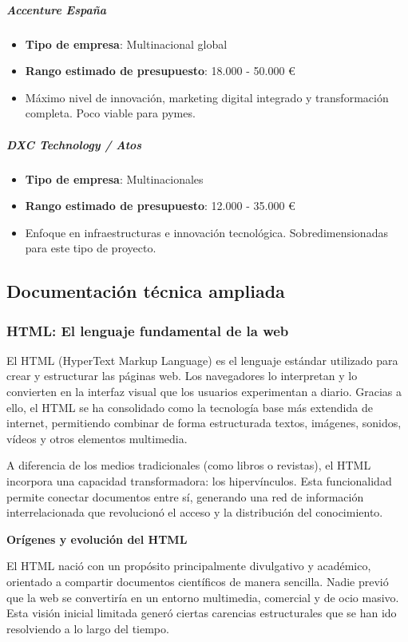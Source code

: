 \documentclass[11.5pt]{article}
\begin{document}
	\subparagraph*{Accenture España}
	
	\begin{itemize}
		\item \textbf{Tipo de empresa}: Multinacional global
		\item \textbf{Rango estimado de presupuesto}: 18.000 - 50.000 €
		\item Máximo nivel de innovación, marketing digital integrado y transformación completa. Poco viable para pymes.
	\end{itemize}
	
	\subparagraph*{DXC Technology / Atos}
	
	\begin{itemize}
		\item \textbf{Tipo de empresa}: Multinacionales
		\item \textbf{Rango estimado de presupuesto}: 12.000 - 35.000 €
		\item Enfoque en infraestructuras e innovación tecnológica. Sobredimensionadas para este tipo de proyecto.
	\end{itemize}
	
	\subsection{Documentación técnica ampliada}
	
	\subsubsection{HTML: El lenguaje fundamental de la web}
	
	El HTML (HyperText Markup Language) es el lenguaje estándar utilizado para crear y estructurar las páginas web. Los navegadores lo interpretan y lo convierten en la interfaz visual que los usuarios experimentan a diario. Gracias a ello, el HTML se ha consolidado como la tecnología base más extendida de internet, permitiendo combinar de forma estructurada textos, imágenes, sonidos, vídeos y otros elementos multimedia.
	
	A diferencia de los medios tradicionales (como libros o revistas), el HTML incorpora una capacidad transformadora: los hipervínculos. Esta funcionalidad permite conectar documentos entre sí, generando una red de información interrelacionada que revolucionó el acceso y la distribución del conocimiento.
	
	\noindent\textbf{{\large Orígenes y evolución del HTML}}

	El HTML nació con un propósito principalmente divulgativo y académico, orientado a compartir documentos científicos de manera sencilla. Nadie previó que la web se convertiría en un entorno multimedia, comercial y de ocio masivo. Esta visión inicial limitada generó ciertas carencias estructurales que se han ido resolviendo a lo largo del tiempo.
	
\end{document}
